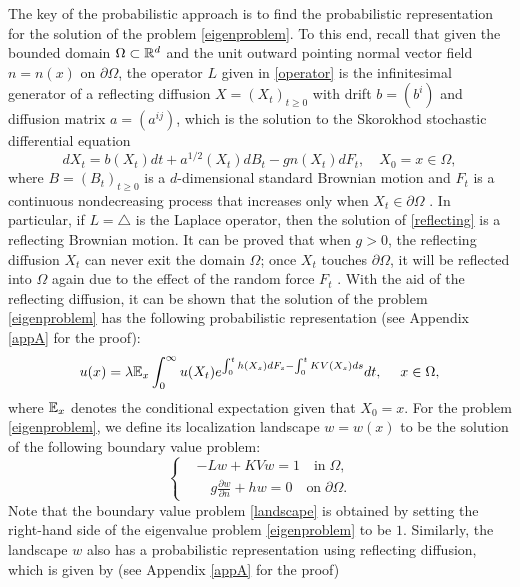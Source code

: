 \documentclass[a4paper,11pt]{article}
\begin{document}
The key of the probabilistic approach is to find the probabilistic representation for the solution of the problem \eqref{eigenproblem}. To this end, recall that given the bounded domain $\Omega \subset \mathbb{R}^d$ and the unit outward pointing normal vector field $n = n(x)$ on $\partial \Omega$, the operator $L$ given in \eqref{operator} is the infinitesimal generator of a reflecting diffusion $X = (X_t)_{t \geq 0}$ with drift $b = (b^i)$ and diffusion matrix $a = (a^{ij})$, which is the solution to the Skorokhod stochastic differential equation
\begin{equation}\label{reflecting}
dX_t = b(X_t) dt + a^{1/2}(X_t) d B_t - g n(X_t) d F_t, \quad X_0 = x\in\Omega,
\end{equation}
where $B = (B_t)_{t\geq 0}$ is a $d$-dimensional standard Brownian motion and $F_t$ is a continuous nondecreasing process that increases only when $X_t \in \partial \Omega$ \cite{1998Diffusions}. In particular, if $L = \triangle$ is the Laplace operator, then the solution of \eqref{reflecting} is a reflecting Brownian motion. It can be proved that when $g > 0$, the reflecting diffusion $X_t$ can never exit the domain $\Omega$; once $X_t$ touches $\partial \Omega$, it will be reflected into $\Omega$ again due to the effect of the random force $F_t$ \cite{1998Diffusions}. With the aid of the reflecting diffusion, it can be shown that the solution of the problem \eqref{eigenproblem} has the following probabilistic representation (see Appendix \ref{appA} for the proof):
\begin{equation}\label{probeigen}
u(x) = \lambda \mathbb{E}_x \int_{0}^{\infty} u(X_t) e^{\int_{0}^{t} h(X_s) d F_s - \int_{0}^{t} K V(X_s) ds} dt, \quad \; x \in \Omega,
\end{equation}
where $\mathbb{E}_x$ denotes the conditional expectation given that $X_0 = x$. For the problem \eqref{eigenproblem}, we define its localization landscape $w = w(x)$ to be the solution of the following boundary value problem:
\begin{equation}\label{landscape}
\left\{
\begin{split}
& - L w + K V w = 1 \quad \textrm{in} \; \Omega, \\
& \quad g \frac{\partial w}{\partial n} + h w = 0 \quad \textrm{on} \; \partial \Omega.
\end{split}
\right.
\end{equation}
Note that the boundary value problem \eqref{landscape} is obtained by setting the right-hand side of the eigenvalue problem \eqref{eigenproblem} to be $1$. Similarly, the landscape $w$ also has a probabilistic representation using reflecting diffusion, which is given by (see Appendix \ref{appA} for the proof)
\end{document}
